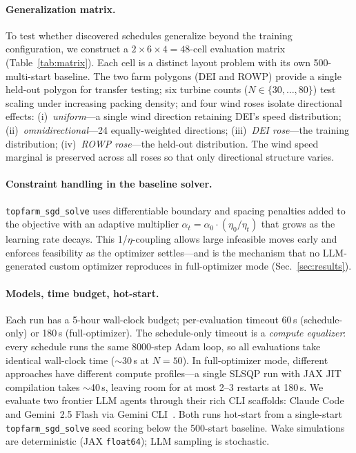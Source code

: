 \paragraph{Generalization matrix.}
To test whether discovered schedules generalize beyond the
training configuration, we construct a $2 \times 6 \times 4 = 48$-cell
evaluation matrix (Table~\ref{tab:matrix}). Each cell is a distinct
layout problem with its own 500-multi-start baseline. The two farm
polygons (DEI and ROWP) provide a single held-out polygon for
transfer testing; six turbine
counts ($N \in \{30, \ldots, 80\}$) test scaling under increasing
packing density; and four wind roses isolate directional effects:
(i)~\emph{uniform}---a single wind direction retaining DEI's speed
distribution; (ii)~\emph{omnidirectional}---24 equally-weighted
directions; (iii)~\emph{DEI rose}---the training distribution;
(iv)~\emph{ROWP rose}---the held-out distribution. The wind speed
marginal is preserved across all roses so that only directional
structure varies.

\paragraph{Constraint handling in the baseline solver.}
\texttt{topfarm\_sgd\_solve} uses differentiable boundary and
spacing penalties added to the objective with an adaptive
multiplier $\alpha_t = \alpha_0 \cdot (\eta_0 / \eta_t)$ that
grows as the learning rate decays. This 1/$\eta$-coupling allows
large infeasible moves early and enforces feasibility as the
optimizer settles---and is the mechanism that no LLM-generated
custom optimizer reproduces in full-optimizer mode (Sec.~\ref{sec:results}).

\paragraph{Models, time budget, hot-start.}
Each run has a 5-hour wall-clock budget; per-evaluation timeout
60\,s (schedule-only) or 180\,s (full-optimizer). The schedule-only
timeout is a \emph{compute equalizer}: every schedule runs the same
8000-step Adam loop, so all evaluations take identical wall-clock
time ($\sim$30\,s at $N\!=\!50$). In full-optimizer mode, different
approaches have different compute profiles---a single SLSQP run
with JAX JIT compilation takes $\sim$40\,s, leaving room for at
most 2--3 restarts at 180\,s.
We evaluate two frontier LLM agents through their rich CLI
scaffolds: Claude Code~\cite{anthropic2025claude} and Gemini~2.5
Flash via Gemini CLI~\cite{gemini2025flash}. Both runs hot-start
from a single-start \texttt{topfarm\_sgd\_solve} seed scoring below
the 500-start baseline. Wake simulations are deterministic (JAX
\texttt{float64}); LLM sampling is stochastic.
